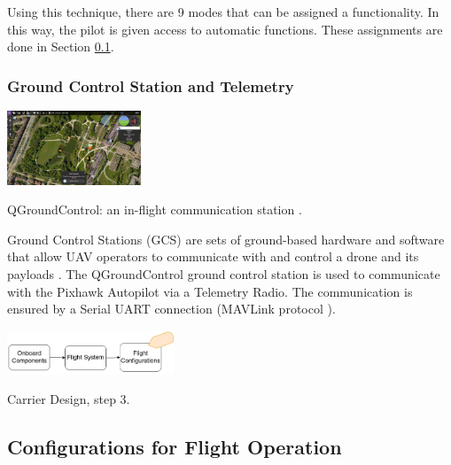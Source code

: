 Using this technique, there are 9 modes that can be assigned a functionality. In this way, the pilot is given access to automatic functions. These assignments are done in Section \ref{section:config}.

\subsubsection{Ground Control Station and Telemetry}

\begin{marginfigure}%
  \hspace{0.3cm}
  \includegraphics[width=4cm]{images/stage_system/qgc_presentation.jpg}
  \caption{ QGroundControl: an in-flight communication station \cite{px4_ecosystem}.}
\end{marginfigure}

Ground Control Stations (GCS) are sets of ground-based hardware and software that allow UAV operators to communicate with and control a drone and its payloads \cite{uav_components}. The QGroundControl ground control station \cite{px4_ecosystem} is used to communicate with the Pixhawk Autopilot via a Telemetry Radio. The communication is ensured by a Serial UART connection (MAVLink protocol \cite{px4_ecosystem}). 

\begin{marginfigure}%
  \vspace{1cm}
  \includegraphics[width=5cm]{images/stage_system/drone_setup/components_order3.png}
  \caption{ Carrier Design, step 3.}
\end{marginfigure}

\subsection{Configurations for Flight Operation}\label{section:config}

